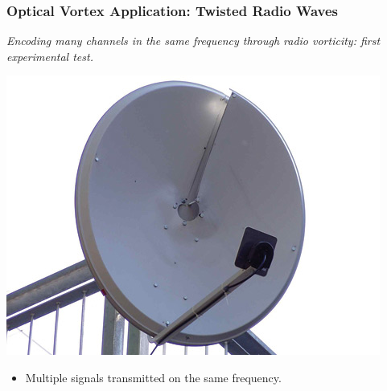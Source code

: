 \documentclass[xcolor=dvipsnames]{beamer}
\newenvironment{items}[1][]
{\begin{itemize}
    \ifthenelse{\isempty{#1}}
    {\setlength{\itemsep}{12pt}}{\setlength{\itemsep}{#1}}}
  {\end{itemize}}
\begin{document}
\begin{frame}
	\frametitle{Optical Vortex Application: Twisted Radio Waves}
	\begin{center}
		\emph{Encoding many channels in the same frequency through radio vorticity: first experimental test.}
	\end{center}
	\begin{minipage}{0.49\textwidth}
    \includegraphics[width=\textwidth]{helical_dish}
	\end{minipage}
	\begin{minipage}{0.49\textwidth}
		\begin{items}
		\item Multiple signals transmitted on the same frequency.
		\end{items}
	\end{minipage}

\end{frame}




\end{document}

